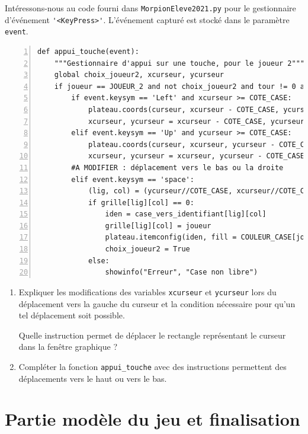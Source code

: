 \documentclass[a4paper, french, 12pt]{article}  %
\newcounter{exo}
\newcounter{exoB}
\newenvironment{exerciceB2}
{\par \bigskip  \noindent \addtocounter{exoB}{1} \hrulefill \quad { \large \textbf{Exercice \theexoB}} \quad \hrulefill \par \medskip }
{\par \bigskip }
\newcounter{def}
\begin{document}
\begin{exerciceB2}{}

Intéressons-nous au code fourni dans \lstinline+MorpionEleve2021.py+ pour le gestionnaire d'événement  \lstinline+'<KeyPress>'+. L'événement capturé est stocké dans le paramètre \lstinline+event+.


\begin{lstlisting}[numbers = left]
def appui_touche(event):
    """Gestionnaire d'appui sur une touche, pour le joueur 2"""
    global choix_joueur2, xcurseur, ycurseur    
    if joueur == JOUEUR_2 and not choix_joueur2 and tour != 0 and vainqueur == 0:
        if event.keysym == 'Left' and xcurseur >= COTE_CASE:
            plateau.coords(curseur, xcurseur - COTE_CASE, ycurseur, xcurseur, ycurseur + COTE_CASE)
            xcurseur, ycurseur = xcurseur - COTE_CASE, ycurseur
        elif event.keysym == 'Up' and ycurseur >= COTE_CASE:
            plateau.coords(curseur, xcurseur, ycurseur - COTE_CASE, xcurseur + COTE_CASE, ycurseur)
            xcurseur, ycurseur = xcurseur, ycurseur - COTE_CASE
        #A MODIFIER : déplacement vers le bas ou la droite
        elif event.keysym == 'space':
            (lig, col) = (ycurseur//COTE_CASE, xcurseur//COTE_CASE)
            if grille[lig][col] == 0:
                iden = case_vers_identifiant[lig][col]
                grille[lig][col] = joueur
                plateau.itemconfig(iden, fill = COULEUR_CASE[joueur])
                choix_joueur2 = True
            else:
                showinfo("Erreur", "Case non libre")
\end{lstlisting}

\begin{enumerate}
	\item Expliquer les modifications des variables \lstinline+xcurseur+ et \lstinline+ycurseur+ lors du déplacement vers la gauche du curseur et la condition nécessaire pour qu'un tel déplacement soit possible.
	
Quelle instruction permet de déplacer le rectangle représentant le curseur dans la fenêtre graphique ?

\item Compléter la fonction \lstinline+appui_touche+ avec des instructions permettent des déplacements vers le haut ou vers le bas.

	
\end{enumerate}


\end{exerciceB2}


\section{Partie modèle du jeu et finalisation}
\end{document}
